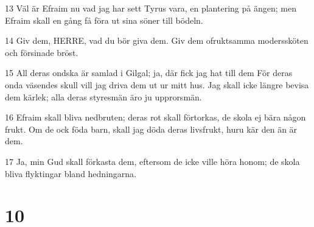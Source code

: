 \par 13 Väl är Efraim nu vad jag har sett Tyrus vara, en plantering på ängen; men Efraim skall en gång få föra ut sina söner till bödeln.
\par 14 Giv dem, HERRE, vad du bör giva dem. Giv dem ofruktsamma moderssköten och försinade bröst.
\par 15 All deras ondska är samlad i Gilgal; ja, där fick jag hat till dem För deras onda väsendes skull vill jag driva dem ut ur mitt hus. Jag skall icke längre bevisa dem kärlek; alla deras styresmän äro ju upprorsmän.
\par 16 Efraim skall bliva nedbruten; deras rot skall förtorkas, de skola ej bära någon frukt. Om de ock föda barn, skall jag döda deras livsfrukt, huru kär den än är dem.
\par 17 Ja, min Gud skall förkasta dem, eftersom de icke ville höra honom; de skola bliva flyktingar bland hedningarna.

\chapter{10}

